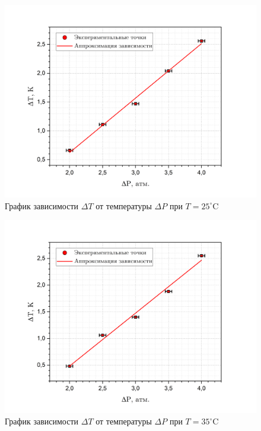 \documentclass[a4paper, 12pt]{article}
\begin{document}
    \begin{figure}[H]
        \centering
        \includegraphics[width=14cm]{images/graph_25.png}
        \caption{График зависимости $\Delta T$ от температуры $\Delta P$ при $T = 25 ^\circ$C}
        \label{graph_25}
    \end{figure}

    \begin{figure}[H]
        \centering
        \includegraphics[width=14cm]{images/graph_35.png}
        \caption{График зависимости $\Delta T$ от температуры $\Delta P$ при $T = 35 ^\circ$C}
        \label{graph_35}
    \end{figure}
\end{document}
